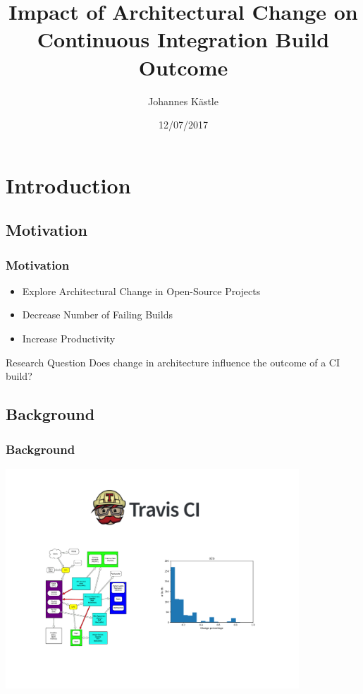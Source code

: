 \documentclass{beamer}
\title[Architectural Change in CI Builds]{Impact of Architectural Change on
	Continuous Integration Build Outcome}
\author{Johannes K{\"a}stle}
\institute{University of Alberta}
\date{12/07/2017}
\begin{document}
 
\frame{\titlepage}
 
\section{Introduction}
\subsection{Motivation}
\begin{frame}
\frametitle{Motivation}

\begin{itemize}
	\item Explore Architectural Change in Open-Source Projects
	\item Decrease Number of Failing Builds
	\item Increase Productivity
\end{itemize}

\pause

\begin{block}{Research Question}
Does change in architecture influence the outcome of a CI build?
\end{block}

\end{frame}


\subsection{Background}
\begin{frame}
\frametitle{Background}

\includegraphics[width=11cm]{assets/Background.pdf}

\end{frame}
\end{document}
